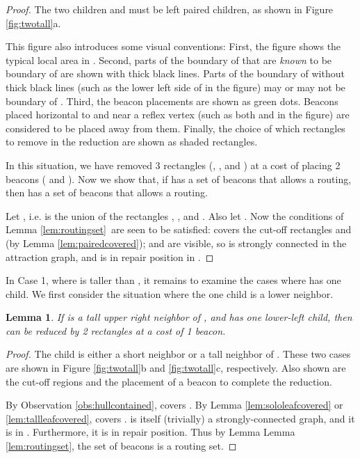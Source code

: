 \documentclass{article}
\newtheorem{lemma}{Lemma}
\begin{document}
		\begin{proof}
			The two children  and  must be left paired
			children, as shown in Figure \ref{fig:twotall}a.

			This figure also introduces some visual conventions: 
			First, the figure shows the typical local area in .
			Second, parts of the boundary of  that are \emph{known} to be boundary of
			 are shown with thick black lines.  Parts of the boundary of  without
			thick black lines (such as the lower left side of  in the figure) may or may not
			be boundary of .
			Third, the beacon placements are shown as green dots.  Beacons placed
			horizontal to and near a reflex vertex (such as both  and  in the figure) are considered to be placed
			 away from them.
			Finally, the choice of which
			rectangles to remove in the reduction are shown as shaded rectangles.

			In this situation,
			we have removed 3 rectangles (, , and ) at a cost of placing 2
			beacons ( and ).
			Now we show that, if  has a set  of beacons that allows a
			routing, then  has a set of beacons 
			that allows a routing.
 
			Let , i.e.  is the union of the
			rectangles , , and .  Also let .
			Now the conditions of Lemma \ref{lem:routingset}\ are seen to be satisfied:
			 covers the cut-off rectangles  and  (by Lemma
			\ref{lem:pairedcovered});  and  are visible, so  is strongly
			connected in the attraction graph, and  is in repair position
			in .
		\end{proof}

		In Case 1, where  is taller than , it remains to examine the cases
		where  has one child.
		We first consider the situation where the one child is a lower neighbor.


		\begin{lemma}\label{lem:lowerleft}
			If  is a tall upper right neighbor of , and  has one
			lower-left child, then  can be reduced by 2 rectangles at a cost of 1 beacon.
		\end{lemma}
		\begin{proof}
			The child  is either a short neighbor or a tall neighbor of .
			These two cases are shown in  Figure \ref{fig:twotall}b and
			\ref{fig:twotall}c, respectively.  Also shown are the cut-off regions  and the
			placement of a beacon  to complete the reduction.
			
			By Observation \ref{obs:hullcontained},  covers .
			By Lemma \ref{lem:sololeafcovered} or  
			\ref{lem:tallleafcovered},  covers .
			 is itself (trivially) a strongly-connected graph,
			and it is in .  Furthermore, it is in repair position. 
			Thus by Lemma  Lemma \ref{lem:routingset}, the set of beacons  is a routing set.
		\end{proof}
\end{document}
